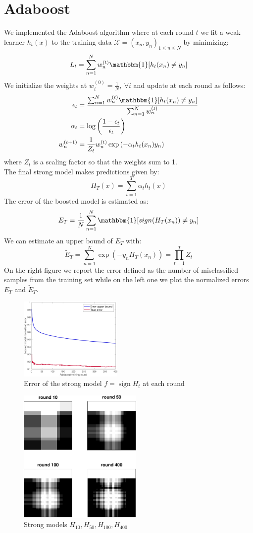 \documentclass{acmsiggraph}
\DeclareMathOperator\sign{sign}
\newcommand{\1}{\mathbbm{1}}
\begin{document}
\section{Adaboost}
We implemented the Adaboost algorithm where at each round $t$ we fit a weak learner $h_t(x)$ to the training data $\mathcal X ={(x_n,y_n)_{1\leq n\leq N}}$ by minimizing:
\[L_t = \sum_{n=1}^Nw_n^{(t)}\1[h_t(x_n)\neq y_n]\]
We initialize the weights at $w_i^{(0)} =\frac{1}{N},\:\forall i$ and update at each round as follows:
\[\begin{split}
\epsilon_t  &= \frac{\sum_{n=1}^N w_n^{(t)} \1[h_t(x_n)\neq y_n]}{\sum_{n=1}^Nw_n^{(t)}}\\
\alpha_t & = \log\left(\frac{1 - \epsilon_t}{\epsilon_t}\right)\\
w_n^{(t+1)} &= \frac{1}{Z_t}w_n^{(t)} \exp\left(-\alpha_t h_t(x_n) y_n\right)
\end{split}\]
where $Z_t$ is a scaling factor so that the weights sum to 1.\\
The final strong model makes predictions given by:
\[H_T(x)=\sum_{t=1}^T\alpha_th_t(x)\]
The error of the boosted model is estimated as:
\[E_T = \frac{1}{N}\sum_{n=1}^N \1[sign(H_T(x_n))\neq y_n]\]
We can estimate an upper bound of $E_T$ with:
\[\widetilde E_T = \sum_{n=1}^N\exp\left(-y_nH_T(x_n)\right) = \prod_{t=1}^TZ_t\]
On the right figure we report the error defined as the number of misclassified samples from the training set while on the left one we plot the normalized errors $E_T$ and $\widetilde E_T$.
\begin{figure}[H]
\centering
\includegraphics[height=4cm]{loss_adaboost}%
\caption*{Error of the strong model $f = \sign H_t$ at each round}
\end{figure}

\begin{figure}[H]
\centering
\includegraphics[width=6cm]{per_round}
\caption*{Strong models $H_{10}, H_{50}, H_{100},H_{400}$}
\end{figure}
\end{document}
